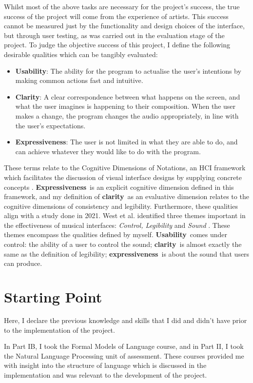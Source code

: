 \documentclass[12pt,a4paper,oneside,openright]{report}
\newcommand{\clarity}{\textbf{clarity}}
\newcommand{\expressiveness}{\textbf{expressiveness}}
\newcommand{\Usability}{\textbf{Usability}}
\newcommand{\Clarity}{\textbf{Clarity}}
\newcommand{\Expressiveness}{\textbf{Expressiveness}}
\begin{document}
Whilst most of the above tasks are necessary for the project's success, the true success of the project will come from the experience of artists. This success cannot be measured just by the functionality and design choices of the interface, but through user testing, as was carried out in the evaluation stage of the project. To judge the objective success of this project, I define the following desirable qualities which can be tangibly evaluated:
\begin{itemize}
    \item \Usability: The ability for the program to actualise the user's intentions by making common actions fast and intuitive.
    \item \Clarity: A clear correspondence between what happens on the screen, and what the user imagines is happening to their composition. When the user makes a change, the program changes the audio appropriately, in line with the user's expectations.
    \item \Expressiveness: The user is not limited in what they are able to do, and can achieve whatever they would like to do with the program.
\end{itemize}

These terms relate to the Cognitive Dimensions of Notations, an HCI framework which facilitates the discussion of visual interface designs by supplying concrete concepts \cite{Green89}. \Expressiveness\ is an explicit cognitive dimension defined in this framework, and my definition of \clarity\ as an evaluative dimension relates to the cognitive dimensions of consistency and legibility. Furthermore, these qualities align with a study done in 2021. West et al. identified three themes important in the effectiveness of musical interfaces: \textit{Control, Legibility} and \textit{Sound} \cite{West21}. These themes encompass the qualities defined by myself. \Usability\ comes under control: the ability of a user to control the sound; \clarity\ is almost exactly the same as the definition of legibility; \expressiveness\ is about the sound that users can produce. 

\section{Starting Point}
Here, I declare the previous knowledge and skills that I did and didn't have prior to the implementation of the project.

In Part IB, I took the Formal Models of Language course, and in Part II, I took the Natural Language Processing unit of assessment. These courses provided me with insight into the structure of language which is discussed in the implementation and was relevant to the development of the project.
\end{document}
